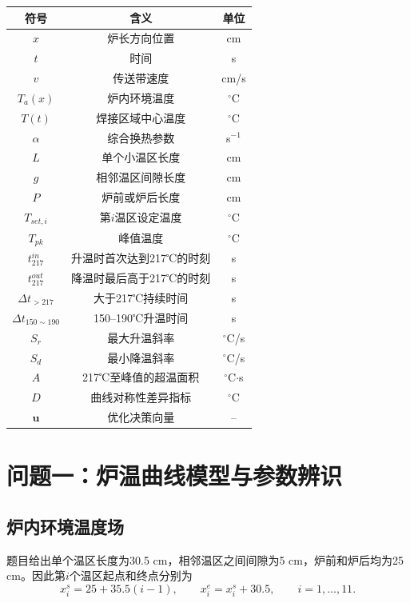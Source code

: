 \documentclass{cumcmthesis}
\begin{document}
\begin{center}
\begin{tabular}{ccc}
\toprule
符号 & 含义 & 单位\\
\midrule
$x$ & 炉长方向位置 & cm\\
$t$ & 时间 & s\\
$v$ & 传送带速度 & cm/s\\
$T_a(x)$ & 炉内环境温度 & ${}^\circ$C\\
$T(t)$ & 焊接区域中心温度 & ${}^\circ$C\\
$\alpha$ & 综合换热参数 & s$^{-1}$\\
$L$ & 单个小温区长度 & cm\\
$g$ & 相邻温区间隙长度 & cm\\
$P$ & 炉前或炉后长度 & cm\\
$T_{set,i}$ & 第$i$温区设定温度 & ${}^\circ$C\\
$T_{pk}$ & 峰值温度 & ${}^\circ$C\\
$t_{217}^{in}$ & 升温时首次达到217℃的时刻 & s\\
$t_{217}^{out}$ & 降温时最后高于217℃的时刻 & s\\
$\Delta t_{>217}$ & 大于217℃持续时间 & s\\
$\Delta t_{150\sim190}$ & 150--190℃升温时间 & s\\
$S_r$ & 最大升温斜率 & ${}^\circ$C/s\\
$S_d$ & 最小降温斜率 & ${}^\circ$C/s\\
$A$ & 217℃至峰值的超温面积 & ${}^\circ$C$\cdot$s\\
$D$ & 曲线对称性差异指标 & ${}^\circ$C\\
$\boldsymbol u$ & 优化决策向量 & --\\
\bottomrule
\end{tabular}
\end{center}

\section{问题一：炉温曲线模型与参数辨识}

\subsection{炉内环境温度场}

题目给出单个温区长度为30.5 cm，相邻温区之间间隙为5 cm，炉前和炉后均为25 cm。因此第$i$个温区起点和终点分别为
\begin{equation}
x_i^s=25+35.5(i-1),\qquad
x_i^e=x_i^s+30.5,\qquad i=1,\ldots,11.
\end{equation}
\end{document}
